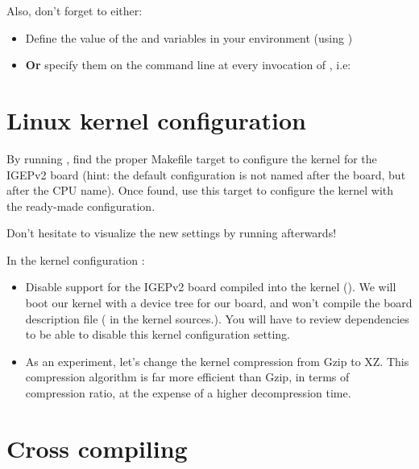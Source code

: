 Also, don't forget to either:

\begin{itemize}
\item Define the value of the  and 
  variables in your environment (using )
\item {\bf Or} specify them on the command line at every invocation of
  , i.e: 
\end{itemize}

\section{Linux kernel configuration}

By running , find the proper Makefile target to
configure the kernel for the IGEPv2 board (hint: the default
configuration is not named after the board, but after the CPU
name). Once found, use this target to configure the kernel with the
ready-made configuration.

Don't hesitate to visualize the new settings by running
 afterwards!

In the kernel configuration :

\begin{itemize}


\item Disable support for the IGEPv2 board compiled into the kernel
  (). We will boot our kernel with a device
  tree for our board, and won't compile the board description
  file ( in the kernel
  sources.). You will have to review dependencies to be able to disable
  this kernel configuration setting. 
\item As an experiment, let's change the kernel compression from Gzip
  to XZ. This compression algorithm is far more efficient than Gzip,
  in terms of compression ratio, at the expense of a higher
  decompression time.
\end{itemize}

\section{Cross compiling}

